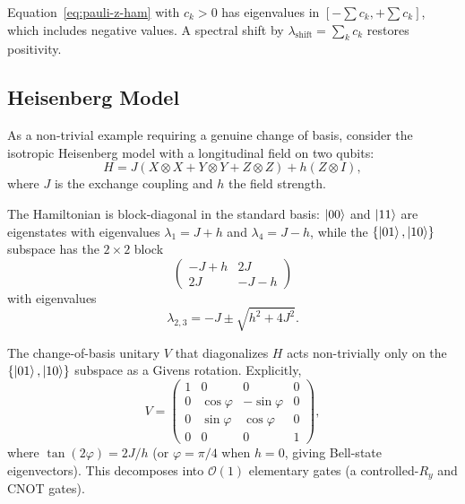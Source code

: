 \begin{remark}
	\label{rem:positivity-pauli}
	Equation~\eqref{eq:pauli-z-ham} with $c_k > 0$ has
	eigenvalues in $[-\sum c_k, +\sum c_k]$, which includes
	negative values.  A spectral shift by
	$\lambda_{\mathrm{shift}} = \sum_k c_k$ restores
	positivity.
\end{remark}

\subsection{Heisenberg Model}
\label{subsec:heisenberg}

As a non-trivial example requiring a genuine change of basis,
consider the isotropic Heisenberg model with a longitudinal field
on two qubits:
\begin{equation}
	H = J(X \otimes X + Y \otimes Y + Z \otimes Z) + h(Z \otimes I),
	\label{eq:heisenberg}
\end{equation}
where $J$ is the exchange coupling and $h$ the field strength.

The Hamiltonian is block-diagonal in the standard basis:
$\ket{00}$ and $\ket{11}$ are eigenstates with eigenvalues
$\lambda_1 = J + h$ and $\lambda_4 = J - h$, while the
$\{\ket{01}, \ket{10}\}$ subspace has the $2\times 2$ block
\begin{equation}
	\begin{pmatrix} -J+h & 2J \\ 2J & -J-h \end{pmatrix}
\end{equation}
with eigenvalues
\begin{equation}
	\lambda_{2,3} = -J \pm \sqrt{h^2 + 4J^2}.
	\label{eq:heisenberg-spectrum}
\end{equation}

The change-of-basis unitary $V$ that diagonalizes $H$ acts
non-trivially only on the $\{\ket{01}, \ket{10}\}$ subspace as
a Givens rotation.  Explicitly,
\begin{equation}
	V = \begin{pmatrix}
		1 & 0           & 0            & 0 \\
		0 & \cos\varphi & -\sin\varphi & 0 \\
		0 & \sin\varphi & \cos\varphi  & 0 \\
		0 & 0           & 0            & 1
	\end{pmatrix},
	\label{eq:givens-rotation}
\end{equation}
where $\tan(2\varphi) = 2J/h$ (or $\varphi = \pi/4$ when
$h = 0$, giving Bell-state eigenvectors).  This decomposes into
$\mathcal{O}(1)$ elementary gates (a controlled-$R_y$ and
CNOT gates).

